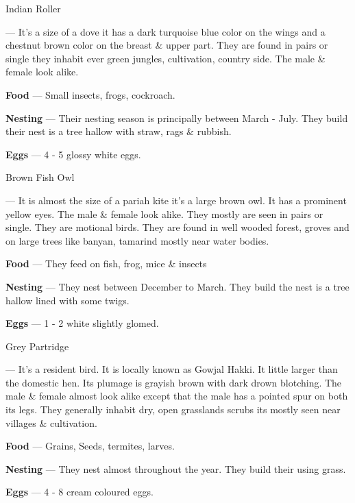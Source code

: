 \begin{bird}{Indian Roller}

 --- It's a size of a dove it has a dark turquoise blue color on the wings and a chestnut brown color on the breast \& upper part. They are found in pairs or single they inhabit ever green jungles, cultivation, country side. The male \& female look alike. 

{\large\bf Food} --- Small insects, frogs, cockroach.

{\large\bf Nesting} --- Their nesting season is principally between March - July. They build their nest is a tree hallow with straw, rags \& rubbish.

{\large\bf Eggs} --- 4 - 5 glossy white eggs. 
\end{bird}

\begin{bird}{Brown Fish Owl}

 --- It is almost the size of a pariah kite it's a large brown owl. It has a prominent yellow eyes. The male \& female look alike. They mostly are seen in pairs or single. They are motional birds. They are found in well wooded  forest, groves and on large trees like banyan, tamarind mostly near water bodies.

{\large\bf Food} --- They feed on fish, frog, mice \& insects

{\large\bf Nesting} --- They nest between December to March. They build the nest is a tree hallow lined with some twigs.

{\large\bf Eggs} --- 1 - 2 white slightly glomed.
\end{bird}

\begin{bird}{Grey Partridge}

 --- It's a resident bird. It is locally known as Gowjal Hakki. It little larger than the domestic hen. Its plumage is grayish brown with dark drown blotching. The male \& female almost look alike except that the male has a pointed spur on both its legs. They generally inhabit dry, open grasslands scrubs its mostly seen near villages \& cultivation.

{\large\bf Food} --- Grains, Seeds, termites, larves.

{\large\bf Nesting} --- They nest almost throughout the year. They build their using grass.

{\large\bf Eggs} --- 4 - 8 cream coloured eggs.
\end{bird}

